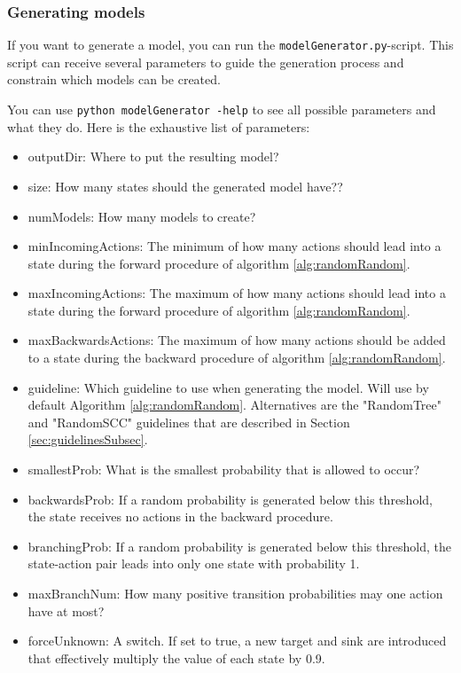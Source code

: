\subsubsection*{Generating models} \label{sec:paramExplanation}
If you want to generate a model, you can run the \texttt{modelGenerator.py}-script.
This script can receive several parameters to guide the generation process and constrain which models can be created.

You can use \texttt{python modelGenerator -help} to see all possible parameters and what they do.
Here is the exhaustive list of parameters:
\begin{itemize} \label{list:params}
    \item outputDir: Where to put the resulting model?
    \item size: How many states should the generated model have??
    \item numModels: How many models to create?
    \item minIncomingActions: The minimum of how many actions should lead into a state during the forward procedure of algorithm \ref{alg:randomRandom}.
    \item maxIncomingActions: The maximum of how many actions should lead into a state during the forward procedure of algorithm \ref{alg:randomRandom}.
    \item maxBackwardsActions: The maximum of how many actions should be added to a state during the backward procedure of algorithm \ref{alg:randomRandom}.
    \item guideline: Which guideline to use when generating the model. Will use by default Algorithm \ref{alg:randomRandom}.
    Alternatives are the "RandomTree" and "RandomSCC" guidelines that are described in Section \ref{sec:guidelinesSubsec}.
    \item smallestProb: What is the smallest probability that is allowed to occur?
    \item backwardsProb: If a random probability is generated below this threshold, the state receives no actions in the backward procedure.
    \item branchingProb: If a random probability is generated below this threshold, the state-action pair leads into only one state with probability 1.
    \item maxBranchNum: How many positive transition probabilities may one action have at most?
    \item forceUnknown: A switch. If set to true, a new target and sink are introduced that effectively multiply the value of each state by 0.9.

\end{itemize}
